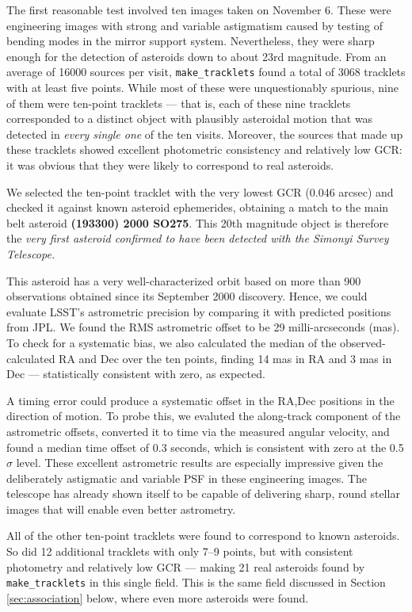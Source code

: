 The first reasonable test involved ten images taken on November 6. These were engineering images with strong and variable astigmatism caused by testing of bending modes in the mirror support system. Nevertheless, they were sharp enough for the detection of asteroids down to about 23rd magnitude. From an average of 16000 sources per visit, {\tt make\_tracklets} found a total of 3068 tracklets with at least five points. While most of these were unquestionably spurious, nine of them were ten-point tracklets --- that is, each of these nine tracklets corresponded to a distinct object with plausibly asteroidal motion that was detected in {\em every single one} of the ten visits. Moreover, the sources that made up these tracklets showed excellent photometric consistency and relatively low GCR: it was obvious that they were likely to correspond to real asteroids. 

We selected the ten-point tracklet with the very lowest GCR (0.046 arcsec) and checked it against known asteroid ephemerides, obtaining a match to the main belt asteroid \textbf{(193300) 2000 SO275}. This 20th magnitude object is therefore the {\em very first asteroid confirmed to have been detected with the Simonyi Survey Telescope.}

This asteroid has a very well-characterized orbit based on more than 900 observations obtained since its September 2000 discovery. Hence, we could evaluate LSST's astrometric precision by comparing it with predicted positions from JPL. We found the RMS astrometric offset to be 29 milli-arcseconds (mas). To check for a systematic bias, we also calculated the median of the observed-calculated RA and Dec over the ten points, finding 14 mas in RA and 3 mas in Dec --- statistically consistent with zero, as expected.

A timing error could produce a systematic offset in the RA,Dec positions in the direction of motion. To probe this, we evaluted the along-track component of the astrometric offsets, converted it to time via the measured angular velocity, and found a median time offset of 0.3 seconds, which is consistent with zero at the 0.5$\sigma$ level. These excellent astrometric results are especially impressive given the deliberately astigmatic and variable PSF in these engineering images. The telescope has already shown itself to be capable of delivering sharp, round stellar images that will enable even better astrometry.

All of the other ten-point tracklets were found to correspond to known asteroids. So did 12 additional tracklets with only 7--9 points, but with consistent photometry and relatively low GCR --- making 21 real asteroids found by {\tt make\_tracklets} in this single field. This is the same field discussed in Section \ref{sec:association} below, where even more asteroids were found.

